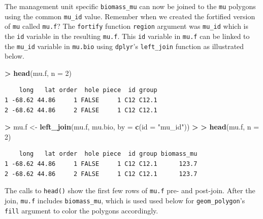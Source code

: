 \documentclass[]{krantz}
\makeatletter
\newenvironment{Shaded}{\begin{snugshade}}{\end{snugshade}}
\newcommand{\DataTypeTok}[1]{\textcolor[rgb]{0.27,0.27,0.27}{#1}}
\newcommand{\DecValTok}[1]{\textcolor[rgb]{0.06,0.06,0.06}{#1}}
\newcommand{\ErrorTok}[1]{\textcolor[rgb]{0.14,0.14,0.14}{\textbf{#1}}}
\newcommand{\KeywordTok}[1]{\textcolor[rgb]{0.27,0.27,0.27}{\textbf{#1}}}
\newcommand{\NormalTok}[1]{#1}
\newcommand{\OperatorTok}[1]{\textcolor[rgb]{0.43,0.43,0.43}{\textbf{#1}}}
\newcommand{\StringTok}[1]{\textcolor[rgb]{0.5,0.5,0.5}{#1}}
\newenvironment{kframe}{%
\medskip{}
\setlength{\fboxsep}{.8em}
 \def\at@end@of@kframe{}%
 \ifinner\ifhmode%
  \def\at@end@of@kframe{\end{minipage}}%
  \begin{minipage}{\columnwidth}%
 \fi\fi%
 \def\FrameCommand##1{\hskip\@totalleftmargin \hskip-\fboxsep
 \colorbox{shadecolor}{##1}\hskip-\fboxsep
     \hskip-\linewidth \hskip-\@totalleftmargin \hskip\columnwidth}%
 \MakeFramed {\advance\hsize-\width
   \@totalleftmargin\z@ \linewidth\hsize
   \@setminipage}}%
 {\par\unskip\endMakeFramed%
 \at@end@of@kframe}
\renewenvironment{Shaded}{\begin{kframe}}{\end{kframe}}
\makeatother
\begin{document}
The management unit specific \texttt{biomass\_mu} can now be joined to the \texttt{mu} polygons using the common \texttt{mu\_id} value. Remember when we created the fortified version of \texttt{mu} called \texttt{mu.f}? The \texttt{fortify} function \texttt{region} argument was \texttt{mu\_id} which is the \texttt{id} variable in the resulting \texttt{mu.f}. This \texttt{id} variable in \texttt{mu.f} can be linked to the \texttt{mu\_id} variable in \texttt{mu.bio} using \texttt{dplyr}'s \texttt{left\_join} function as illustrated below.

\begin{Shaded}
\begin{Highlighting}[]
\OperatorTok{>}\StringTok{ }\KeywordTok{head}\NormalTok{(mu.f, }\DataTypeTok{n =} \DecValTok{2}\NormalTok{)}
\end{Highlighting}
\end{Shaded}

\begin{verbatim}
    long   lat order  hole piece  id group
1 -68.62 44.86     1 FALSE     1 C12 C12.1
2 -68.62 44.86     2 FALSE     1 C12 C12.1
\end{verbatim}

\begin{Shaded}
\begin{Highlighting}[]
\OperatorTok{>}\StringTok{ }\NormalTok{mu.f <-}\StringTok{ }\KeywordTok{left_join}\NormalTok{(mu.f, mu.bio, }\DataTypeTok{by =} \KeywordTok{c}\NormalTok{(}\DataTypeTok{id =} \StringTok{"mu_id"}\NormalTok{))}
\OperatorTok{>}\StringTok{ }
\ErrorTok{>}\StringTok{ }\KeywordTok{head}\NormalTok{(mu.f, }\DataTypeTok{n =} \DecValTok{2}\NormalTok{)}
\end{Highlighting}
\end{Shaded}

\begin{verbatim}
    long   lat order  hole piece  id group biomass_mu
1 -68.62 44.86     1 FALSE     1 C12 C12.1      123.7
2 -68.62 44.86     2 FALSE     1 C12 C12.1      123.7
\end{verbatim}

The calls to \texttt{head()} show the first few rows of \texttt{mu.f} pre- and post-join. After the join, \texttt{mu.f} includes \texttt{biomass\_mu}, which is used used below for \texttt{geom\_polygon}'s \texttt{fill} argument to color the polygons accordingly.
\end{document}
